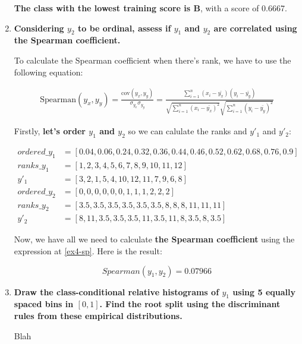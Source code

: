 \documentclass[12pt]{article}
\begin{document}
\begin{enumerate}[leftmargin=\labelsep]
    \textbf{The class with the lowest training score is B}, with a score of 0.6667.


    \item \textbf{Considering $y_2$ to be ordinal, assess if $y_1$ and $y_2$ are correlated using the Spearman coefficient.}

    \vskip 0.3cm

    To calculate the Spearman coefficient when there's rank, we have to use the following equation:

    \begin{equation}\label{ex4-sp}
        \begin{split}
            \text{Spearman}(y_x, y_y) = \frac{\text{cov}(y_x, y_y)}{\sigma_{y_x} \sigma_{y_y}}
            = \frac{\sum_{i=1}^{n} (x_i - \bar{y_x})(y_i - \bar{y_y})}{\sqrt{\sum_{i=1}^{n} (x_i- \bar{y_x})^2}\sqrt{\sum_{i=1}^{n} (y_i- \bar{y_y})^2}}
        \end{split}
    \end{equation}

    Firstly, \textbf{let's order $y_1$ and $y_2$} so we can calulate the ranks and $y'_1$ and $y'_2$:

    \begin{align*}
        ordered\_y_{1} & = [0.04, 0.06, 0.24, 0.32, 0.36, 0.44, 0.46, 0.52, 0.62, 0.68, 0.76, 0.9]\\
        ranks\_y_{1}   & = [1,2,3,4,5,6,7,8,9,10,11,12]\\
        y'_{1}         & = [3,2,1,5,4,10,12,11,7,9,6,8]\\
        ordered\_y_{2} & = [0,0,0,0,0,0,1,1,1,2,2,2]\\
        ranks\_y_{2}   & = [3.5, 3.5, 3.5, 3.5, 3.5, 3.5, 8, 8, 8, 11, 11, 11]\\
        y'_{2}         & = [8, 11, 3.5, 3.5, 3.5, 11, 3.5, 11, 8, 3.5, 8, 3.5]
    \end{align*}

    Now, we have all we need to calculate \textbf{the Spearman coefficient} using the expression at \eqref{ex4-sp}. Here is the result:

    \[
        Spearman(y_{1}, y_{2}) = 0.07966
    \]


    \item \textbf{Draw the class-conditional relative histograms of $y_1$ using 5 equally spaced bins in $[0,1]$.
    Find the root split using the discriminant rules from these empirical distributions.}

    \vskip 0.3cm
    Blah
\end{enumerate}
\end{document}

